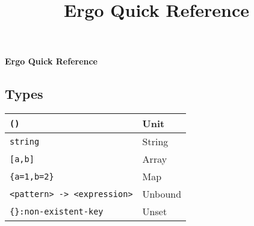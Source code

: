 \documentclass{article}
\title{Ergo Quick Reference}
\begin{document}
\begin{center}
	\huge{\bf Ergo Quick Reference}
\end{center}

\begin{multicols}{3}

\section{Types}

\begin{tabular}{ |l|l| }
\hline
\texttt{()} & Unit \\
\hline
\texttt{string} & String \\
\hline
\texttt{[a,b]} & Array \\
\hline
\texttt{\{a=1,b=2\}} & Map \\
\hline
\texttt{<pattern> -> <expression>} & Unbound \\
\hline
\texttt{\{\}:non-existent-key} & Unset \\
\hline
\end{tabular}

\end{multicols}
\end{document}
